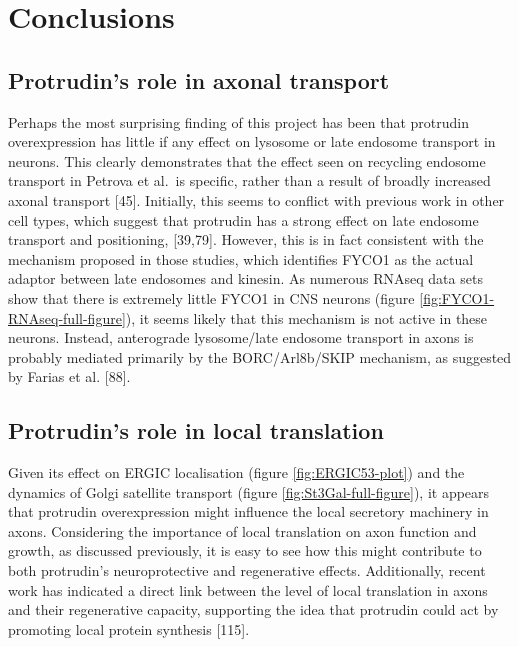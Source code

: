 \documentclass[
  12pt,
  a4paper,
]{book}
\begin{document}
\hypertarget{conclusions}{%
\section{Conclusions}\label{conclusions}}

\hypertarget{protrudins-role-in-axonal-transport}{%
\subsection{Protrudin's role in axonal transport}\label{protrudins-role-in-axonal-transport}}

Perhaps the most surprising finding of this project has been that protrudin overexpression has little if any effect on lysosome or late endosome transport in neurons. This clearly demonstrates that the effect seen on recycling endosome transport in Petrova et al.~is specific, rather than a result of broadly increased axonal transport {[}45{]}. Initially, this seems to conflict with previous work in other cell types, which suggest that protrudin has a strong effect on late endosome transport and positioning, {[}39,79{]}. However, this is in fact consistent with the mechanism proposed in those studies, which identifies FYCO1 as the actual adaptor between late endosomes and kinesin. As numerous RNAseq data sets show that there is extremely little FYCO1 in CNS neurons (figure \ref{fig:FYCO1-RNAseq-full-figure}), it seems likely that this mechanism is not active in these neurons. Instead, anterograde lysosome/late endosome transport in axons is probably mediated primarily by the BORC/Arl8b/SKIP mechanism, as suggested by Farias et al. {[}88{]}.

\hypertarget{protrudins-role-in-local-translation}{%
\subsection{Protrudin's role in local translation}\label{protrudins-role-in-local-translation}}

Given its effect on ERGIC localisation (figure \ref{fig:ERGIC53-plot}) and the dynamics of Golgi satellite transport (figure \ref{fig:St3Gal-full-figure}), it appears that protrudin overexpression might influence the local secretory machinery in axons. Considering the importance of local translation on axon function and growth, as discussed previously, it is easy to see how this might contribute to both protrudin's neuroprotective and regenerative effects. Additionally, recent work has indicated a direct link between the level of local translation in axons and their regenerative capacity, supporting the idea that protrudin could act by promoting local protein synthesis {[}115{]}.
\end{document}
